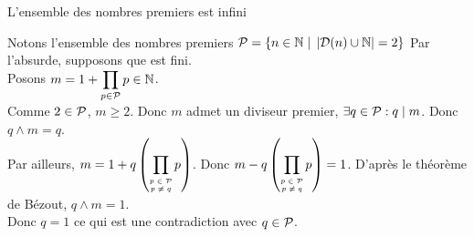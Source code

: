 \documentclass{article}
\date{20 Février 2024}
\begin{document}
\maketitle

\begin{question_kholle}
	{L'ensemble des nombres premiers est infini}
	
	Notons l'ensemble des nombres premiers $\mathcal P = \left\{ n \in \mathbb N \;|\; \left| \mathcal{D}(n) \cup \mathbb N \right| = 2 \right\}$
	Par l'absurde, supposons que \PRIME est fini. \\
	Posons $\displaystyle m = 1 + \prod_{p \in \mathcal P} p \in \mathbb N$. \\
	Comme $2 \in \mathcal P$, $m \geqslant 2$. Donc $m$ admet un diviseur premier, $\exists q \in \mathcal P : q \;|\; m$. Donc $q \wedge m = q$. \\
	Par ailleurs, $\displaystyle m = 1 + q \left( \prod_{\tiny \begin{matrix} p \in \mathcal P \\ p \neq q \end{matrix}} p \right)$. Donc $\displaystyle m - q \left( \prod_{\tiny \begin{matrix} p \in \mathcal P \\ p \neq q \end{matrix}} p \right) = 1$. D'après le théorème de Bézout, $q \wedge m = 1$. \\
	Donc $q = 1$ ce qui est une contradiction avec $q \in \mathcal P$.
\end{question_kholle}
\end{document}
